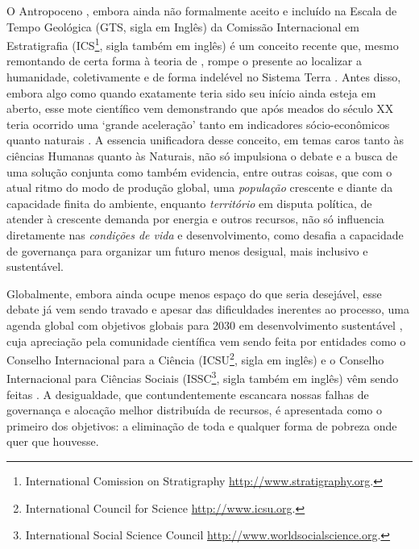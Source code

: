 \documentclass[
	11pt,				%
	openany,			%
	oneside,			%
	a4paper,			%
	english,			%
	french,				%
	spanish,			%
	brazil,				%
	]{abntex2}
\begin{document}
O Antropoceno \cite{crutzen_anthropocene_2000,crutzen_geology_2002}, embora ainda não formalmente aceito e incluído na Escala de Tempo Geológica \cite{gradstein_geologic_2005,cohen_ics_2013} (GTS, sigla em Inglês) da Comissão Internacional em Estratigrafia (ICS\footnote{International Comission on Stratigraphy \url{http://www.stratigraphy.org}.}, sigla também em inglês) é um conceito recente que, mesmo remontando de certa forma à teoria de , rompe o presente \cite{hamilton_anthropocene_2016} ao localizar a humanidade, coletivamente e de forma indelével \cite{zalasiewicz_new_2010,zalasiewicz_anthropocene:_2011} no Sistema Terra \cite{jacobson_earth_2000}. Antes disso, embora algo como quando exatamente teria sido seu início ainda esteja em aberto\cite{zalasiewicz_when_2015}, esse mote científico vem demonstrando que após meados do século XX teria ocorrido uma `grande aceleração' tanto em indicadores sócio-econômicos quanto naturais  \cite{steffen_anthropocene:_2011}. A essencia unificadora desse conceito, em temas caros tanto às ciências Humanas quanto às Naturais, não só impulsiona o debate e a busca de uma solução conjunta como também evidencia, entre outras coisas, que com o atual ritmo do modo de produção global, uma \emph{população} crescente e diante da capacidade finita do ambiente, enquanto \emph{território} em disputa política, de atender à crescente demanda por energia e outros recursos, não só influencia diretamente nas \emph{condições de vida} e desenvolvimento, como desafia a capacidade de governança para organizar um futuro menos desigual, mais inclusivo e sustentável.

Globalmente, embora ainda ocupe menos espaço do que seria desejável, esse debate já vem sendo travado e apesar das dificuldades inerentes ao processo, uma agenda global com objetivos globais para 2030 em desenvolvimento sustentável \cite{united_nations_transforming_2015}, cuja apreciação pela comunidade científica vem sendo feita por entidades como o Conselho Internacional para a Ciência (ICSU\footnote{International Council for Science \url{http://www.icsu.org}.}, sigla em inglês) e o Conselho Internacional para Ciências Sociais (ISSC\footnote{International Social Science Council \url{http://www.worldsocialscience.org}.}, sigla também em inglês) vêm sendo feitas \cite{icsu-issc_review_2015}. A desigualdade, que contundentemente escancara nossas falhas de governança e alocação melhor distribuída de recursos, é apresentada como o primeiro dos objetivos: a eliminação de toda e qualquer forma de pobreza onde quer que houvesse.
\end{document}
